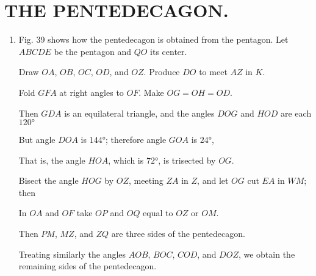 
\chapter{THE PENTEDECAGON.}


\begin{enumerate}

\item Fig. 39 shows how the pentedecagon is obtained from the pentagon.  Let
    $ABCDE$ be the pentagon and $QO$ its center.

%
%
%
%
%

    Draw $OA$, $OB$, $OC$, $OD$, and $OZ$. Produce $DO$ to meet $AZ$ in $K$.


    Fold $GFA$ at right angles to $OF$. Make $OG= OH = OD$.

    Then $GDA$ is an equilateral triangle, and the angles $DOG$ and $HOD$ are
    each $120°$

    But angle $DOA$ is $144°$; therefore angle $GOA$ is $24°$,

    That is, the angle $HOA$, which is $72°$, is trisected by $OG$.

    Bisect the angle $HOG$ by $OZ$, meeting $ZA$ in $Z$, and let $OG$ cut $EA$
    in $WM$; then

%
    In $OA$ and $OF$ take $OP$ and $OQ$ equal to $OZ$ or $OM$.

    Then $PM$, $MZ$, and $ZQ$ are three sides of the pentedecagon.

    Treating similarly the angles $AOB$, $BOC$, $COD$, and $DOZ$, we obtain the
    remaining sides of the pentedecagon.

\end{enumerate}


